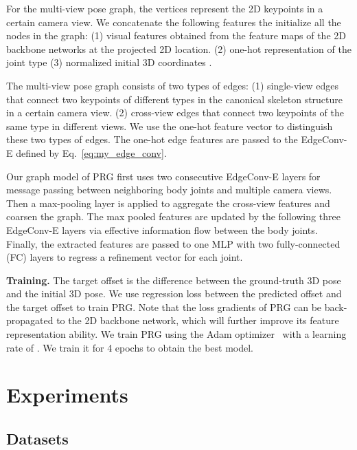 \documentclass[10pt,twocolumn,letterpaper]{article}
\begin{document}
For the multi-view pose graph, the vertices represent the 2D keypoints in a certain camera view. We concatenate the following features the initialize all the nodes in the graph: 
(1) visual features  obtained from the feature maps of the 2D backbone networks at the projected 2D location.
(2) one-hot representation of the joint type  (3) normalized initial 3D coordinates . 

The multi-view pose graph consists of two types of edges: (1) single-view edges that connect two keypoints of different types in the canonical skeleton structure in a certain camera view. (2) cross-view edges that connect two keypoints of the same type in different views. We use the one-hot feature vector  to distinguish these two types of edges. The one-hot edge features are passed to the EdgeConv-E defined by Eq.~\ref{eq:my_edge_conv}.

Our graph model of PRG first uses two consecutive EdgeConv-E layers for message passing between neighboring body joints and multiple camera views. Then a max-pooling layer is applied to aggregate the cross-view features and coarsen the graph. The max pooled features are updated by the following three EdgeConv-E layers via effective information flow between the body joints. Finally, the extracted features are passed to one MLP with two fully-connected (FC) layers to regress a refinement vector for each joint.

\textbf{Training.} The target offset is the difference between the ground-truth 3D pose and the initial 3D pose. We use  regression loss between the predicted offset and the target offset to train PRG. Note that the loss gradients of PRG can be back-propagated to the 2D backbone network, which will further improve its feature representation ability. We train PRG using the Adam optimizer~\cite{kingma2014method} with a learning rate of . We train it for 4 epochs to obtain the best model.

\section{Experiments}

\subsection{Datasets}
\end{document}
